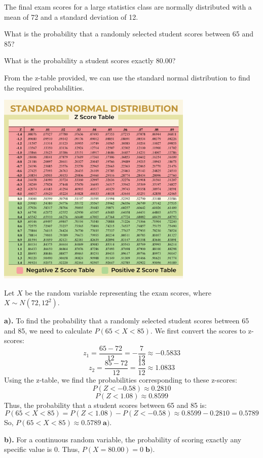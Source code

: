\documentclass[a4paper, 10pt]{article}
\begin{document}
\begin{tosubmit}
\problem
The final exam scores for a large statistics class are normally distributed with a
mean of 72 and a standard deviation of 12.
\begin{subproblems}
    \item What is the probability that a randomly selected student scores between 65 and 85?
    \item What is the probability a student scores exactly 80.00?
\end{subproblems}

\par\noindent\submitsolution
From the z-table provided, we can use the standard normal distribution to find the required probabilities.
\begin{center}
    \includegraphics[width=0.70\textwidth]{Images/z-score.png}
\end{center}

Let \( X \) be the random variable representing the exam scores, where \( X \sim N(72, 12^2) \).

\vspace{2mm}

\textbf{a).} To find the probability that a randomly selected student scores between 65 and 85, we need to calculate \( P(65 < X < 85) \).
We first convert the scores to z-scores:
\[ z_1 = \frac{65 - 72}{12} = -\frac{7}{12} \approx -0.5833 \]
\[ z_2 = \frac{85 - 72}{12} = \frac{13}{12} \approx 1.0833 \]
Using the z-table, we find the probabilities corresponding to these z-scores:
\[ P(Z < -0.58) \approx 0.2810 \]
\[ P(Z < 1.08) \approx 0.8599 \]
Thus, the probability that a student scores between 65 and 85 is:
\[ P(65 < X < 85) = P(Z < 1.08) - P(Z < -0.58) \approx 0.8599 - 0.2810 = 0.5789 \]
So, \( P(65 < X < 85) \approx \boxed{0.5789} \; \textbf{a).} \)

\vspace{2mm}

\textbf{b).} For a continuous random variable, the probability of scoring exactly any specific value is 0.
Thus, \( P(X = 80.00) = \boxed{0} \;\textbf{b).} \)
\end{tosubmit}
\end{document}
